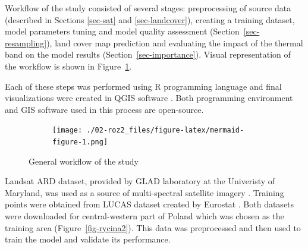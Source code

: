 \documentclass{amuthesis}
\begin{document}
Workflow of the study consisted of several stages: preprocessing of
source data (described in Sections \ref{sec-sat} and
\ref{sec-landcover}), creating a training dataset, model parameters
tuning and model quality assessment (Section~\ref{sec-resampling}), land
cover map prediction and evaluating the impact of the thermal band on
the model results (Section~\ref{sec-importance}). Visual representation
of the workflow is shown in Figure~\ref{fig-rycina1}.

Each of these steps was performed using R programming language
\autocite{R-base} and final visualizations were created in QGIS software
\autocite{qgis_development_team_qgis_2009}. Both programming environment
and GIS software used in this process are open-source.

\begin{figure}

{\centering 

\begin{figure}[H]

{\centering \texttt{[image: ./02-roz2\_files/figure-latex/mermaid-figure-1.png]}

}

\end{figure}

}

\caption{\label{fig-rycina1}General workflow of the study}

\end{figure}

Landsat ARD dataset, provided by GLAD laboratory at the Univeristy of
Maryland, was used as a source of multi-spectral satellite imagery
\autocite{potapov_landsat_2020}. Training points were obtained from
LUCAS dataset created by Eurostat \autocite{dandrimont_harmonised_2020}.
Both datasets were downloaded for central-western part of Poland which
was chosen as the training area (Figure~\ref{fig-rycina2}). This data
was preprocessed and then used to train the model and validate its
performance.
\end{document}

